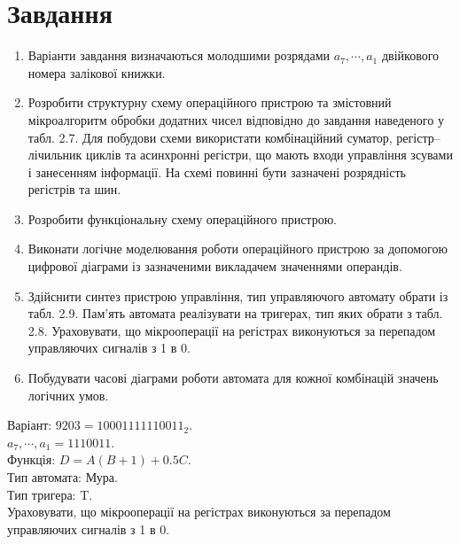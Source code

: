 \documentclass[a4paper, 10pt]{article}
\begin{document}
\section{Завдання}
\begin{enumerate}
    \item Варіанти завдання визначаються молодшими розрядами $a_{7},\cdots,a_{1}$ двійкового номера залікової книжки.
    \item Розробити структурну схему операційного пристрою та змістовний мікроалгоритм обробки  додатних чисел відповідно до завдання наведеного у табл. 2.7. Для побудови схеми використати комбінаційний суматор, регістр--лічильник циклів та асинхронні регістри, що мають входи управління зсувами і занесенням інформації. На схемі повинні бути зазначені розрядність регістрів та шин.
    \item Розробити функціональну схему операційного пристрою.
    \item Виконати логічне моделювання роботи операційного пристрою за допомогою цифрової діаграми  із зазначеними викладачем значеннями операндів.
    \item Здійснити синтез пристрою управління, тип управляючого автомату обрати із табл. 2.9. Пам’ять автомата реалізувати на тригерах, тип яких обрати з табл. 2.8. Ураховувати, що мікрооперації на регістрах виконуються за перепадом управляючих сигналів з 1 в 0.
    \item Побудувати часові діаграми роботи автомата для кожної комбінацій значень логічних умов.
\end{enumerate}
Варіант: $9203=10001111110011_2$.\\
$a_{7},\cdots,a_{1}=1110011.$\\
Функція: $D=A(B+1)+0.5C.$\\
Тип автомата: Мура.\\
Тип тригера: T.\\
Ураховувати, що мікрооперації на регістрах виконуються за перепадом управляючих сигналів з 1 в 0.
\end{document}
